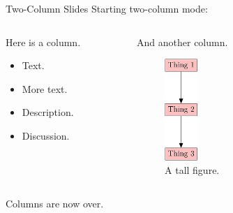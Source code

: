 \documentclass[10pt,ignorenonframetext,]{beamer}
\providecommand{\tightlist}{%
  \setlength{\itemsep}{0pt}\setlength{\parskip}{0pt}}
\begin{document}
\begin{frame}{Two-Column Slides}
\protect\hypertarget{two-column-slides-1}{}
Starting two-column mode:

\begin{columns}[T]
\begin{column}{0.4\textwidth}
Here is a column.

\begin{itemize}[<+->]
\tightlist
\item
  Text.
\item
  More text.
\item
  Description.
\item
  Discussion.
\end{itemize}
\end{column}

\begin{column}{0.4\textwidth}
And another column.

\begin{figure}
\centering
\includegraphics[width=0.2\textwidth,height=\textheight]{figures/tall_figure.png}
\caption{A tall figure.}
\end{figure}
\end{column}
\end{columns}

Columns are now over.
\end{frame}
\end{document}
